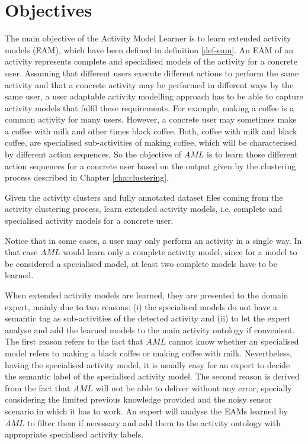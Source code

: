 \section{Objectives}
\label{sec:learner:objectives}

The main objective of the Activity Model Learner is to learn extended activity models (EAM), which have been defined in definition \ref{def-eam}. An EAM of an activity represents complete and specialised models of the activity for a concrete user. Assuming that different users execute different actions to perform the same activity and that a concrete activity may be performed in different ways by the same user, a user adaptable activity modelling approach has to be able to capture activity models that fulfil these requirements. For example, making a coffee is a common activity for many users. However, a concrete user may sometimes make a coffee with milk and other times black coffee. Both, coffee with milk and black coffee, are specialised sub-activities of making coffee, which will be characterised by different action sequences. So the objective of $AML$ is to learn those different action sequences for a concrete user based on the output given by the clustering process described in Chapter \ref{cha:clustering}.

\begin{problem}[$AML$]
\label{pro-aml}
 Given the activity clusters and fully annotated dataset files coming from the activity clustering process, learn extended activity models, i.e. complete and specialised activity models for a concrete user.
\end{problem}

Notice that in some cases, a user may only perform an activity in a single way. In that case $AML$ would learn only a complete activity model, since for a model to be considered a specialised model, at least two complete models have to be learned. 

When extended activity models are learned, they are presented to the domain expert, mainly due to two reasons: (i) the specialised models do not have a semantic tag as sub-activities of the detected activity and (ii) to let the expert analyse and add the learned models to the main activity ontology if convenient. The first reason refers to the fact that $AML$ cannot know whether an specialised model refers to making a black coffee or making coffee with milk. Nevertheless, having the specialised activity model, it is usually easy for an expert to decide the semantic label of the specialised activity model. The second reason is derived from the fact that $AML$ will not be able to deliver without any error, specially considering the limited previous knowledge provided and the noisy sensor scenario in which it has to work. An expert will analyse the EAMs learned by $AML$ to filter them if necessary and add them to the activity ontology with appropriate specialised activity labels.

